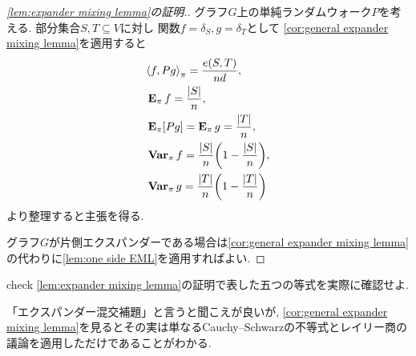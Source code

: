 \begin{proof}[\cref{lem:expander mixing lemma}の証明.]
    グラフ$G$上の単純ランダムウォーク$P$を考える.
    部分集合$S,T\subseteq V$に対し
    関数$f=\delta_S,g=\delta_T$として
    \cref{cor:general expander mixing lemma}を適用すると
    \begin{align*}
         & \piprod{f,Pg} = \frac{e(S,T)}{nd},               \\
         & \Epi f = \frac{|S|}{n},                          \\
         & \Epi [Pg] = \Epi g = \frac{|T|}{n},              \\
         & \Varpi f = \frac{|S|}{n}\rbra*{1-\frac{|S|}{n}}, \\
         & \Varpi g = \frac{|T|}{n}\rbra*{1-\frac{|T|}{n}}
    \end{align*}
    より整理すると主張を得る.

    グラフ$G$が片側エクスパンダーである場合は\cref{cor:general expander mixing lemma}の代わりに\cref{lem:one side EML}を適用すればよい.
\end{proof}
\begin{exercise}{}{check}
    \cref{lem:expander mixing lemma}の証明で表した五つの等式を実際に確認せよ.
\end{exercise}
「エクスパンダー混交補題」と言うと聞こえが良いが, \cref{cor:general expander mixing lemma}を見るとその実は単なるCauchy--Schwarzの不等式とレイリー商の議論を適用しただけであることがわかる.

